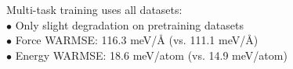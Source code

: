 \documentclass[preview]{standalone}
\begin{document}
\begin{center}
Multi-task training uses all datasets: \\
            $\bullet$ Only slight degradation on pretraining datasets \\
            $\bullet$ Force WARMSE: 116.3 meV/Å (vs. 111.1 meV/Å) \\
            $\bullet$ Energy WARMSE: 18.6 meV/atom (vs. 14.9 meV/atom)
\end{center}
\end{document}
